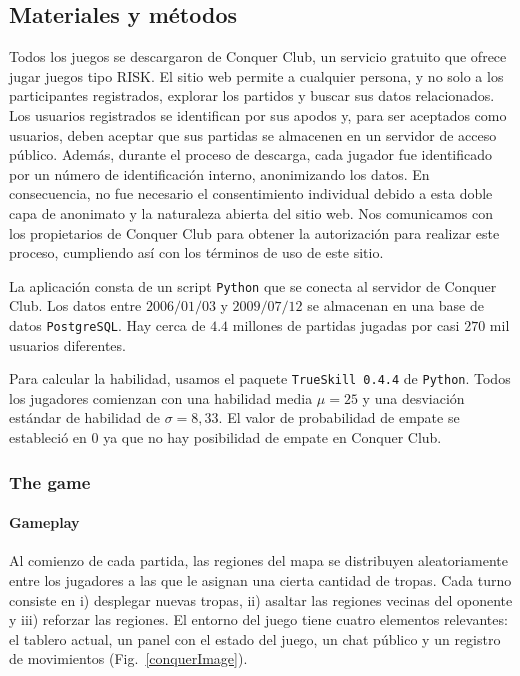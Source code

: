 \documentclass[a4paper,10pt]{book}
\theoremstyle{definition}
\begin{document}
\subsection{Materiales y métodos}

Todos los juegos se descargaron de Conquer Club, un servicio gratuito que ofrece jugar juegos tipo RISK.
%
El sitio web permite a cualquier persona, y no solo a los participantes registrados, explorar los partidos y buscar sus datos relacionados.
%
Los usuarios registrados se identifican por sus apodos y, para ser aceptados como usuarios, deben aceptar que sus partidas se almacenen en un servidor de acceso p\'ublico.
%
Además, durante el proceso de descarga, cada jugador fue identificado por un n\'umero de identificaci\'on interno, anonimizando los datos.
%
En consecuencia, no fue necesario el consentimiento individual debido a esta doble capa de anonimato y la naturaleza abierta del sitio web.
%
Nos comunicamos con los propietarios de Conquer Club para obtener la autorizaci\'on para realizar este proceso, cumpliendo as\'i con los términos de uso de este sitio.


La aplicaci\'on consta de un script \texttt{Python} que se conecta al servidor de Conquer Club.
%
Los datos entre $2006/01/03$ y $2009/07/12$ se almacenan en una base de datos \texttt{PostgreSQL}.
Hay cerca de $4.4$ millones de partidas jugadas por casi $270$ mil usuarios diferentes.

Para calcular la habilidad, usamos el paquete \texttt{TrueSkill 0.4.4} de \texttt{Python}.
%
Todos los jugadores comienzan con una habilidad media $\mu = 25$ y una desviaci\'on estándar de habilidad de $\sigma = 8,33$.
%
El valor de probabilidad de empate se estableci\'o en 0 ya que no hay posibilidad de empate en Conquer Club.

\subsubsection{The game}

\paragraph{Gameplay}\label{sub:gameplay}

Al comienzo de cada partida, las regiones del mapa se distribuyen aleatoriamente entre los jugadores a las que le asignan una cierta cantidad de tropas.
%
Cada turno consiste en i) desplegar nuevas tropas, ii) asaltar las regiones vecinas del oponente y iii) reforzar las regiones.
%
El entorno del juego tiene cuatro elementos relevantes: el tablero actual, un panel con el estado del juego, un chat p\'ublico y un registro de movimientos (Fig.~\ref{conquerImage}).
\end{document}
